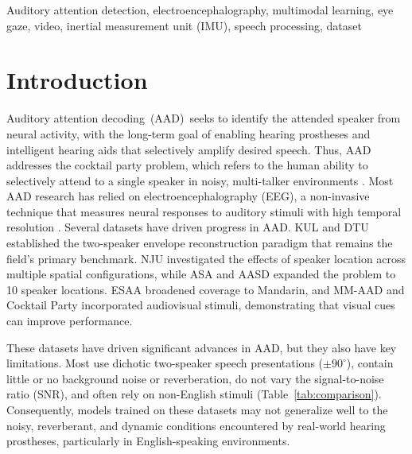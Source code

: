 \documentclass[journal]{IEEEtran}
\begin{document}
\begin{IEEEkeywords}
Auditory attention detection, electroencephalography, multimodal learning, eye gaze, video, inertial measurement unit (IMU), speech processing, dataset
\end{IEEEkeywords}

\section{Introduction}
\label{sec:intro}

Auditory attention decoding~(AAD)~seeks to identify the attended speaker from neural activity, with the long-term goal of enabling hearing prostheses and intelligent hearing aids that selectively amplify desired speech. Thus, AAD addresses the cocktail party problem, which refers to the human ability to selectively attend to a single speaker in noisy, multi-talker environments \cite{cherry1953}. Most AAD research has relied on electroencephalography (EEG), a non-invasive technique that measures neural responses to auditory stimuli with high temporal resolution \cite{geirnaert2021, biesmans2016, fuglsang2017, osullivan2015, yang2026deep, ciccarelli2019}. Several datasets have driven progress in AAD. KUL \cite{biesmans2016} and DTU \cite{fuglsang2017} established the two-speaker envelope reconstruction paradigm that remains the field's primary benchmark. NJU \cite{nju2023} investigated the effects of speaker location across multiple spatial configurations, while ASA \cite{lin2024} and AASD \cite{wang2026open} expanded the problem to 10  speaker locations. ESAA \cite{esaa2022} broadened coverage to Mandarin, and MM-AAD \cite{mmaad2025} and Cocktail Party \cite{jaha2020visual} incorporated audiovisual stimuli, demonstrating that visual cues can improve performance.

These datasets have driven significant advances in AAD, but they also have key limitations. Most use dichotic two-speaker speech presentations ($\pm 90^{\circ}$), contain little or no background noise or reverberation, do not vary the signal-to-noise ratio (SNR), and often rely on non-English stimuli (Table~\ref{tab:comparison}). Consequently, models trained on these datasets may not generalize well to the noisy, reverberant, and dynamic conditions encountered by real-world hearing prostheses, particularly in English-speaking environments.

\IEEEpubidadjcol 
\end{document}
